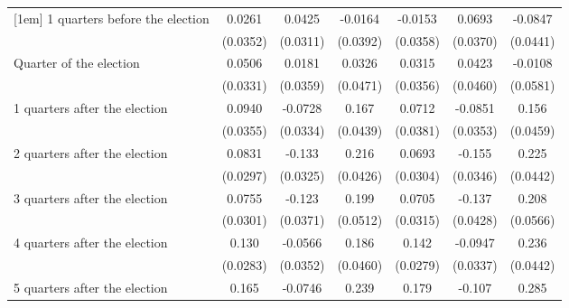 \begin{table}[!ht]
\begin{tabular}{l*{6}{c}}
[1em]
 1 quarters before the election&      0.0261         &      0.0425         &     -0.0164         &     -0.0153         &      0.0693         &     -0.0847         \\
                    &    (0.0352)         &    (0.0311)         &    (0.0392)         &    (0.0358)         &    (0.0370)         &    (0.0441)         \\
[1em]
Quarter of the election&      0.0506         &      0.0181         &      0.0326         &      0.0315         &      0.0423         &     -0.0108         \\
                    &    (0.0331)         &    (0.0359)         &    (0.0471)         &    (0.0356)         &    (0.0460)         &    (0.0581)         \\
[1em]
 1 quarters after the election&      0.0940\sym{**} &     -0.0728\sym{*}  &       0.167\sym{***}&      0.0712         &     -0.0851\sym{*}  &       0.156\sym{***}\\
                    &    (0.0355)         &    (0.0334)         &    (0.0439)         &    (0.0381)         &    (0.0353)         &    (0.0459)         \\
[1em]
 2 quarters after the election&      0.0831\sym{**} &      -0.133\sym{***}&       0.216\sym{***}&      0.0693\sym{*}  &      -0.155\sym{***}&       0.225\sym{***}\\
                    &    (0.0297)         &    (0.0325)         &    (0.0426)         &    (0.0304)         &    (0.0346)         &    (0.0442)         \\
[1em]
 3 quarters after the election&      0.0755\sym{*}  &      -0.123\sym{***}&       0.199\sym{***}&      0.0705\sym{*}  &      -0.137\sym{**} &       0.208\sym{***}\\
                    &    (0.0301)         &    (0.0371)         &    (0.0512)         &    (0.0315)         &    (0.0428)         &    (0.0566)         \\
[1em]
 4 quarters after the election&       0.130\sym{***}&     -0.0566         &       0.186\sym{***}&       0.142\sym{***}&     -0.0947\sym{**} &       0.236\sym{***}\\
                    &    (0.0283)         &    (0.0352)         &    (0.0460)         &    (0.0279)         &    (0.0337)         &    (0.0442)         \\
[1em]
 5 quarters after the election&       0.165\sym{***}&     -0.0746\sym{*}  &       0.239\sym{***}&       0.179\sym{***}&      -0.107\sym{**} &       0.285\sym{***}\\

\end{tabular}
\end{table}
